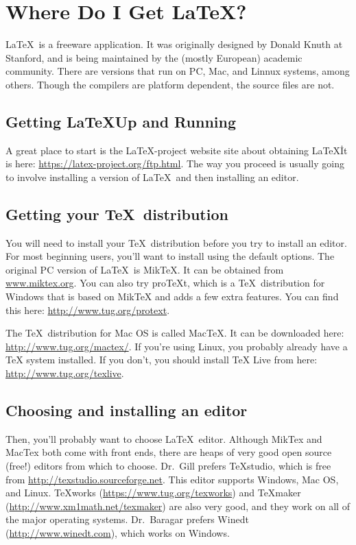 \chapter[: Where Do I Get \LaTeX?]{Where Do I Get \LaTeX?}

\LaTeX\ is a freeware application.  It was originally designed by Donald Knuth at Stanford, and is being maintained by the (mostly European) academic community.  There are versions that run on PC, Mac, and Linnux systems, among others.  Though the compilers are platform dependent, the source files are not. 

\section{Getting \LaTeX Up and Running}

A great place to start is the \LaTeX-project website site about obtaining \LaTeX\. It is here: \url{https://latex-project.org/ftp.html}. The way you proceed is usually going to involve installing a version of \LaTeX\ and then installing an editor.

\section{Getting your \TeX\ distribution}

You will need to install your \TeX\ distribution before you try to install an editor. For most beginning users, you'll want to install using the default options. The original PC version of \LaTeX\ is MikTeX.  It can be obtained from \url{www.miktex.org}. You can also try proTeXt, which is a \TeX\ distribution for Windows that is based on MikTeX and adds a few extra features. You can find this here: \url{http://www.tug.org/protext}.

The \TeX\ distribution for Mac OS is called MacTeX. It can be downloaded here: \url{http://www.tug.org/mactex/}. If you're using Linux, you probably already have a TeX system installed. If you don't, you should install TeX Live from here: \url{http://www.tug.org/texlive}.

\section{Choosing and installing an editor}

 Then, you'll probably want to choose \LaTeX\ editor. Although MikTex and MacTex both come with front ends, there are heaps of very good open source (free!) editors from which to choose. Dr.\ Gill prefers TeXstudio, which is free from \url{http://texstudio.sourceforge.net}. This editor supports Windows, Mac OS, and Linux. TeXworks (\url{https://www.tug.org/texworks}) and TeXmaker (\url{http://www.xm1math.net/texmaker}) are also very good, and they work on all of the major operating systems. Dr.\ Baragar prefers Winedt (\url{http://www.winedt.com}), which works on Windows. 
 
